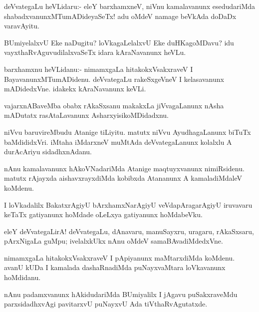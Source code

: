 \documentclass{article}
\begin{document}
\begin{mn}%
deVvategaLu heVLidaru:- eleY barxhamxneV, niVnu kamalavanunx
esedudariMda shabadxvanunxMTumADideyaSeTx! adu oMdeV namage beVkAda
doDaDx varavAyitu.
\end{mn}

\begin{mn}%
BUmiyelalxvU Eke naDugitu? loVkagaLelalxvU Eke duHKagoMDavu? idu
vayxthaRvAguvudilalxvaSeTx idara kAraNavanunx heVLu.
\end{mn}

\begin{mn}
barxhamxnu heVLidanu:- nimamxgaLa hitakokxVsakxraveV I
BayavanunxMTumADidenu. deVvategaLu rakeSxgeVneV I kelasavanunx
mADidedxVne. idakekx kAraNavanunx keVLi.
\end{mn}

\begin{mn}
vajarxnABaveMba obabx rAkaSxsanu makakxLa jiVvagaLanunx nAsha mADutatx
rasAtaLavanunx AsharxyisikoMDidadxnu.
\end{mn}

\begin{mn}
niVvu baruvireMbudu Atanige tiLiyitu. matutx niVvu AyudhagaLanunx
biTuTx baMdididxVri. iMtaha iMdarxneV muMtAda deVvategaLanunx kolalxlu
A durAcAriyu sidadhxnAdanu.
\end{mn}

\begin{mn}
nAnu kamalavanunx hAkoVNadariMda Atanige maqtuyxvanunx
nimiRsidenu. matutx rAjayxda aishavxrayxdiMda kobibxda Atananunx A
kamaladiMdaleV koMdenu.
\end{mn}

\begin{mn}%
I loVkadalilx BakatxrAgiyU bArxhamxNarAgiyU veVdapAragarAgiyU
iruvavaru keTaTx gatiyanunx hoMdade oLeLxya gatiyanunx hoMdabeVku.
\end{mn}

\begin{mn}
eleY deVvategaLirA! deVvategaLu, dAnavaru, manuSayxru, uragaru,
rAkaSxsaru, pArxNigaLa guMpu; ivelalxkUkx nAnu oMdeV samaBAvadiMdedxVne.
\end{mn}

\begin{mn}
nimamxgaLa hitakokxVsakxraveV I pApiyanunx maMtarxdiMda koMdenu. avanU
kUDa I kamalada dashaRnadiMda puNayxvaMtara loVkavanunx hoMdidanu.
\end{mn}

\begin{mn}
nAnu padamxvanunx hAkidudariMda BUmiyalilx I jAgavu puSakxraveMdu
parxsidadhxvAgi pavitarxvU puNayxvU Ada tiVthaRvAgutatxde.
\end{mn}
\end{document}
